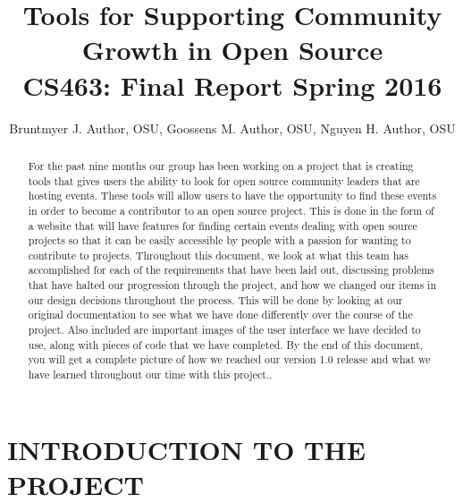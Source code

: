 \documentclass[draftclsnofoot,10pt,onecolumn]{IEEEtran} %
\begin{document}

\title{Tools for Supporting Community Growth in Open Source \\ {\large CS463: Final Report Spring 2016}}

\author{Bruntmyer J. Author, OSU, Goossens M. Author, OSU, Nguyen H. Author, OSU}



\maketitle
\begin{abstract}
For the past nine months our group has been working on a project that is creating tools that
gives users the ability to look for open source community leaders that are
hosting events. These tools will allow
users to have the opportunity to find these events in order to become a
contributor to an open source project. This is done in the form of a website that
will have features for finding certain events dealing with open source projects
so that it can be easily accessible by people with a passion for wanting to
contribute to projects. Throughout this document, we look at what this team has
accomplished for each of the requirements that have been laid out, discussing problems
that have halted our progression through the project, and how we changed our items in
our design decisions throughout the process. This will be done by looking at our
original documentation to see what we have done differently over the course of the
project. Also included are important images of the user interface we have decided
to use, along with pieces of code that we have completed. By the end of this document, 
you will get a complete picture of how we
reached our version 1.0 release and what we have learned throughout our time with this
project..
\end{abstract}

\newpage

\tableofcontents

\newpage


\section{INTRODUCTION TO THE PROJECT}
\end{document}
